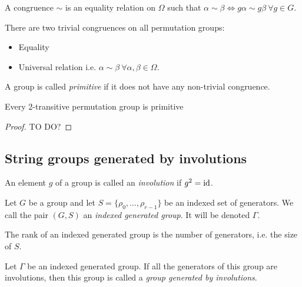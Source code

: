 \begin{definition}[Congruence]
  A congruence $\sim$ is an equality relation on $\Omega$ such that $\alpha \sim \beta \Leftrightarrow g\alpha \sim g\beta \ \forall g \in G$.
\end{definition}

There are two trivial congruences on all permutation groups:
\begin{itemize}
  \item Equality
  \item Universal relation i.e. $\alpha \sim \beta \ \forall \alpha, \beta \in \Omega$.
\end{itemize}

\begin{definition}
  A group is called \textit{primitive} if it does not have any non-trivial congruence.
\end{definition}

\begin{property}
  \label{2-transitive-primitive}
  Every 2-transitive permutation group is primitive
\end{property}

\begin{proof}
  TO DO?
\end{proof}

\subsection{String groups generated by involutions}

\begin{definition}[Involution]
  An element $g$ of a group is called an \textit{involution} if $g^2 = \operatorname{id}$.
\end{definition}

\begin{definition}
  Let $G$ be a group and let $S = \{\rho_0, \dots, \rho_{r-1}\}$ be an indexed set of generators.
  We call the pair $(G,S)$ an \textit{indexed generated group}. It will be denoted $\Gamma$.
\end{definition}

\begin{definition}
  The rank of an indexed generated group is the number of generators, i.e. the size of $S$.
\end{definition}

\begin{definition}
  Let $\Gamma$ be an indexed generated group. If all the generators of this group are involutions, then this group is called a \textit{group generated by involutions}.
\end{definition}

